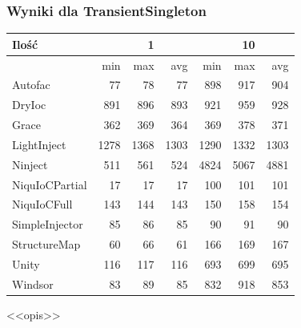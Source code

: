 \documentclass[12pt]{article}
\begin{document}
\subsubsection{Wyniki dla TransientSingleton}
\begin{center}
\begin{small}
	\begin{tabular}{ | l | r r r | r r r | }
    		\hline
     		Ilość & & 1 & & & 10 &  \\ \hline
     		 & min & max & avg & min & max & avg \\ \hline
		Autofac & 77 & 78 & 77 & 898 & 917 & 904 \\ \hline
		DryIoc & 891 & 896 & 893 & 921 & 959 & 928 \\ \hline
		Grace & 362 & 369 & 364 & 369 & 378 & 371 \\ \hline
		LightInject & 1278 & 1368 & 1303 & 1290 & 1332 & 1303 \\ \hline
		Ninject & 511 & 561 & 524 & 4824 & 5067 & 4881 \\ \hline
		NiquIoCPartial & 17 & 17 & 17 & 100 & 101 & 101 \\ \hline
		NiquIoCFull & 143 & 144 & 143 & 150 & 158 & 154 \\ \hline
		SimpleInjector & 85 & 86 & 85 & 90 & 91 & 90 \\ \hline
		StructureMap & 60 & 66 & 61 & 166 & 169 & 167 \\ \hline
		Unity & 116 & 117 & 116 & 693 & 699 & 695 \\ \hline
		Windsor & 83 & 89 & 85 & 832 & 918 & 853 \\
    		\hline
  	\end{tabular}
\end{small}
\end{center}
<<opis>>
\end{document}
